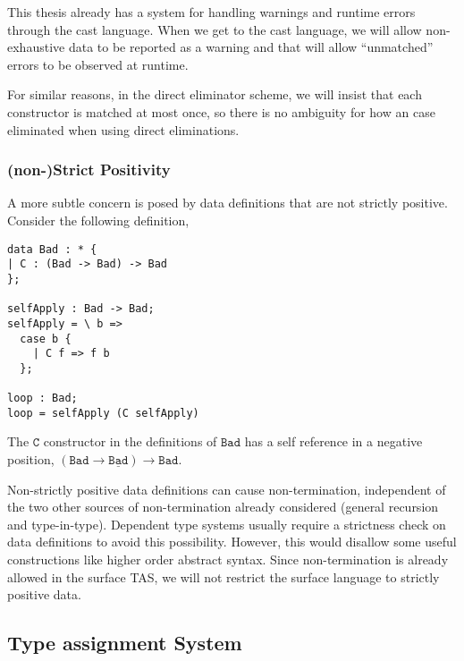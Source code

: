 
This thesis already has a system for handling warnings and runtime
errors through the cast language. When we get to the cast language,
we will allow non-exhaustive data to be reported as a warning and
that will allow ``unmatched'' errors to be observed at runtime.

For similar reasons, in the direct eliminator scheme, we will insist
that each constructor is matched at most once, so there is no ambiguity
for how an case eliminated when using direct eliminations.

\subsubsection{(non-)Strict Positivity}

A more subtle concern is posed by data definitions that are not strictly
positive. Consider the following definition, 

\begin{lstlisting}[basicstyle={\ttfamily\small}]
data Bad : * {
| C : (Bad -> Bad) -> Bad
};

selfApply : Bad -> Bad;
selfApply = \ b =>
  case b {
    | C f => f b
  };

loop : Bad;
loop = selfApply (C selfApply)
\end{lstlisting}

The $\mathtt{C}$ constructor in the definitions of $\mathtt{Bad}$
has a self reference in a negative position, $(\mathtt{Bad}\rightarrow\underline{\mathtt{Bad}})\rightarrow\mathtt{Bad}$. 

Non-strictly positive data definitions can cause non-termination,
independent of the two other sources of non-termination already considered
(general recursion and type-in-type). Dependent type systems usually
require a strictness check on data definitions to avoid this possibility.
However, this would disallow some useful constructions like higher
order abstract syntax. Since non-termination is already allowed in
the surface TAS, we will not restrict the surface language to strictly
positive data.



\subsection{Type assignment System}

